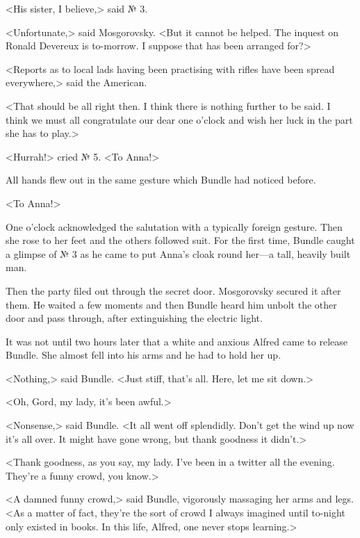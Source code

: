<His sister, I believe,> said № 3.

<Unfortunate,> said Mosgorovsky. <But it cannot be helped. The inquest on Ronald Devereux is to-morrow. I suppose that has been arranged for?>

<Reports as to local lads having been practising with rifles have been spread everywhere,> said the American.

<That should be all right then. I think there is nothing further to be said. I think we must all congratulate our dear one o'clock and wish her luck in the part she has to play.>

<Hurrah!> cried № 5. <To Anna!>

All hands flew out in the same gesture which Bundle had noticed before.

<To Anna!>

One o'clock acknowledged the salutation with a typically foreign gesture. Then she rose to her feet and the others followed suit. For the first time, Bundle caught a glimpse of № 3 as he came to put Anna's cloak round her—a tall, heavily built man.

Then the party filed out through the secret door. Mosgorovsky secured it after them. He waited a few moments and then Bundle heard him unbolt the other door and pass through, after extinguishing the electric light.

It was not until two hours later that a white and anxious Alfred came to release Bundle. She almost fell into his arms and he had to hold her up.

<Nothing,> said Bundle. <Just stiff, that's all. Here, let me sit down.>

<Oh, Gord, my lady, it's been awful.>

<Nonsense,> said Bundle. <It all went off splendidly. Don't get the wind up now it's all over. It might have gone wrong, but thank goodness it didn't.>

<Thank goodness, as you say, my lady. I've been in a twitter all the evening. They're a funny crowd, you know.>

<A damned funny crowd,> said Bundle, vigorously massaging her arms and legs. <As a matter of fact, they're the sort of crowd I always imagined until to-night only existed in books. In this life, Alfred, one never stops learning.>